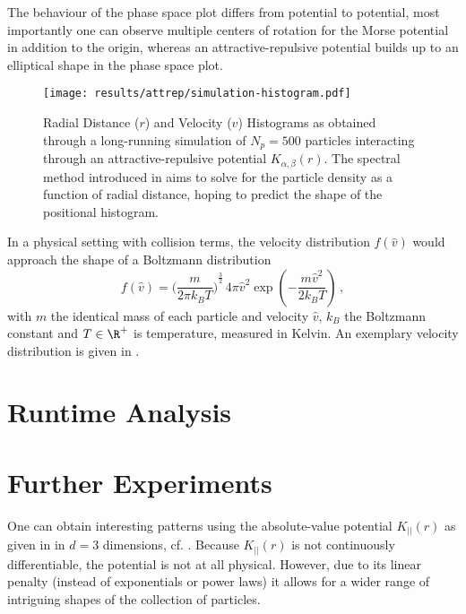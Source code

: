 The behaviour of the phase space plot differs from potential to potential, most importantly one can observe multiple centers of rotation for the Morse potential in addition to the origin, whereas an attractive-repulsive potential builds up to an elliptical shape in the phase space plot.

\begin{figure}[H]
  \centering
  \texttt{[image: results/attrep/simulation-histogram.pdf]}
  \caption[Radial Distance and Velocity Histograms of attractive-repulsive Simulation Output in 1D]{Radial Distance ($r$) and Velocity ($v$) Histograms as obtained through a long-running simulation of $N_p = 500$ particles interacting through an attractive-repulsive potential $K_{\alpha, \beta}(r)$. The spectral method introduced in  aims to solve for the particle density as a function of radial distance, hoping to predict the shape of the positional histogram.}
  \label{fig:simulation-histogram}
\end{figure}

In a physical setting with collision terms, the velocity distribution $f(\hat{v})$ would approach the shape of a Boltzmann distribution
$$f(\hat{v})={\bigg(\frac{m}{2\pi k_B T}\bigg)}^{\frac {3}{2}}\,4\pi \hat{v}^{2}\exp \left(-{\frac {m \hat{v}^{2}}{2k_B T}}\right)\,,$$
with $m$ the identical mass of each particle and velocity $\hat{v}$, $k_B$ the Boltzmann constant and $T \in \R^+$ is temperature, measured in Kelvin.
An exemplary velocity distribution is given in .

\section{Runtime Analysis}
\hierKoennteIhreWerbungStehen

\section{Further Experiments}
One can obtain interesting patterns using the absolute-value potential $K_{||}(r)$ as given in  in $d=3$ dimensions, cf. .
Because $K_{||}(r)$ is not continuously differentiable, the potential is not at all physical.
However, due to its linear penalty (instead of exponentials or power laws) it allows for a wider range of intriguing shapes of the collection of particles.

